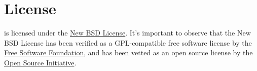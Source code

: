 \documentclass[a4paper,twoside,12pt]{memoir}
\begin{document}
\cleardoublepage

\section*{License}
\label{sec:license}

\arara is licensed under the 
\href{http://www.opensource.org/licenses/bsd-license.php}{New BSD License}. It's
important to observe that the New BSD License has been verified as a 
GPL-compatible free software license by the 
\href{http://www.fsf.org/}{Free Software Foundation}, and has been vetted as an 
open source license by the 
\href{http://www.opensource.org/}{Open Source Initiative}.

\vspace{1.5em}

\ornamentline

\vfill
\end{document}
